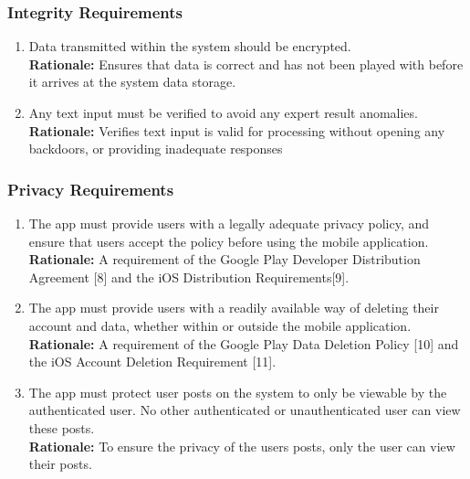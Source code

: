 \documentclass[]{article}
\begin{document}
\subsubsection{Integrity Requirements}
\label{ssub:integrity_requirements}
\begin{enumerate}[{SR-INT}1. ]
\item Data transmitted within the system should be encrypted. \\
\textbf{Rationale:} Ensures that data is correct and has not been played with before it arrives at the system data storage.

\item Any text input must be verified to avoid any expert result anomalies. \\
\textbf{Rationale:} Verifies text input is valid for processing without opening any backdoors, or providing inadequate responses
\end{enumerate}

\subsubsection{Privacy Requirements}
\label{ssub:privacy_requirements}
\begin{enumerate}[{SR-P}1. ]
\item The app must provide users with a legally adequate privacy policy, and ensure that users accept the policy before using the mobile application. \\
\textbf{Rationale:} A requirement of the Google Play Developer Distribution Agreement [8] and the iOS Distribution Requirements[9].

\item The app must provide users with a readily available way of deleting their account and data, whether within or outside the mobile application.\\
\textbf{Rationale:} A requirement of the Google Play Data Deletion Policy [10] and the iOS Account Deletion Requirement [11].

\item The app must protect user posts on the system to only be viewable by the authenticated user. No other authenticated or unauthenticated user can view these posts. \\
\textbf{Rationale:} To ensure the privacy of the users posts, only the user can view their posts.
\end{enumerate}
\end{document}
